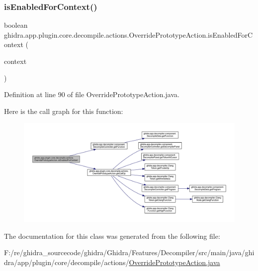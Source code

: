 \subsubsection{\texorpdfstring{isEnabledForContext()}{isEnabledForContext()}}
{\footnotesize\ttfamily boolean ghidra.\+app.\+plugin.\+core.\+decompile.\+actions.\+Override\+Prototype\+Action.\+is\+Enabled\+For\+Context (\begin{DoxyParamCaption}\item[{Action\+Context}]{context }\end{DoxyParamCaption})\hspace{0.3cm}{\ttfamily [inline]}}



Definition at line 90 of file Override\+Prototype\+Action.\+java.

Here is the call graph for this function\+:
\nopagebreak
\begin{figure}[H]
\begin{center}
\leavevmode
\includegraphics[width=350pt]{classghidra_1_1app_1_1plugin_1_1core_1_1decompile_1_1actions_1_1_override_prototype_action_aa035bd212f83d2cb35253ef232fa18bb_cgraph}
\end{center}
\end{figure}


The documentation for this class was generated from the following file\+:\begin{DoxyCompactItemize}
\item 
F\+:/re/ghidra\+\_\+sourcecode/ghidra/\+Ghidra/\+Features/\+Decompiler/src/main/java/ghidra/app/plugin/core/decompile/actions/\mbox{\hyperlink{_override_prototype_action_8java}{Override\+Prototype\+Action.\+java}}\end{DoxyCompactItemize}
